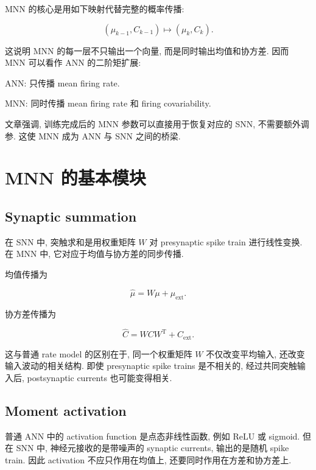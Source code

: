 \documentclass[oneside]{ctexart}
\begin{document}
MNN 的核心是用如下映射代替完整的概率传播:

\begin{equation}
    (\mu_{k-1},C_{k-1})
    \longmapsto
    (\mu_k,C_k).
\end{equation}

这说明 MNN 的每一层不只输出一个向量, 而是同时输出均值和协方差. 因而 MNN 可以看作 ANN 的二阶矩扩展:

\begin{center}
    ANN: 只传播 mean firing rate.

    MNN: 同时传播 mean firing rate 和 firing covariability.
\end{center}

文章强调, 训练完成后的 MNN 参数可以直接用于恢复对应的 SNN, 不需要额外调参. 这使 MNN 成为 ANN 与 SNN 之间的桥梁.

\section{MNN 的基本模块}

\subsection{Synaptic summation}

在 SNN 中, 突触求和是用权重矩阵 $W$ 对 presynaptic spike train 进行线性变换. 在 MNN 中, 它对应于均值与协方差的同步传播.

均值传播为

\begin{equation}
    \hat{\mu}
    =
    W\mu+\mu_{\mathrm{ext}}.
\end{equation}

协方差传播为

\begin{equation}
    \hat{C}
    =
    WCW^{\mathrm T}+C_{\mathrm{ext}}.
\end{equation}

这与普通 rate model 的区别在于, 同一个权重矩阵 $W$ 不仅改变平均输入, 还改变输入波动的相关结构. 即使 presynaptic spike trains 是不相关的, 经过共同突触输入后, postsynaptic currents 也可能变得相关.

\subsection{Moment activation}

普通 ANN 中的 activation function 是点态非线性函数, 例如 ReLU 或 sigmoid. 但在 SNN 中, 神经元接收的是带噪声的 synaptic currents, 输出的是随机 spike train. 因此 activation 不应只作用在均值上, 还要同时作用在方差和协方差上.
\end{document}
